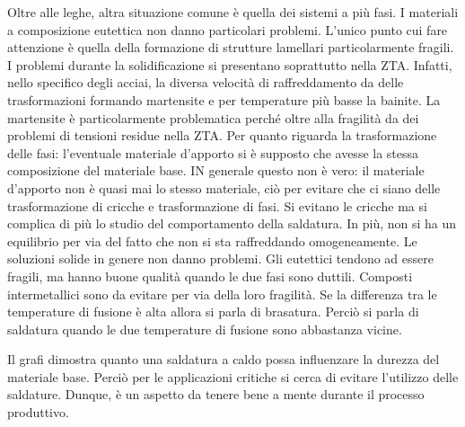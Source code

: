 Oltre alle leghe, altra situazione comune è quella dei sistemi a più fasi.
I materiali a composizione eutettica non danno particolari problemi. L'unico punto cui fare attenzione è quella della formazione di strutture lamellari particolarmente fragili.
I problemi durante la solidificazione si presentano soprattutto nella \ac{ZTA}.
Infatti, nello specifico degli acciai, la diversa velocità di raffreddamento da delle trasformazioni formando martensite e per temperature più basse la bainite.
La martensite è particolarmente problematica perché oltre alla fragilità da dei problemi di tensioni residue nella \ac{ZTA}.
Per quanto riguarda la trasformazione delle fasi: l'eventuale materiale d'apporto si è supposto che avesse la stessa composizione del materiale base. IN generale questo non è vero: il materiale d'apporto non è quasi mai lo stesso materiale, ciò per evitare che ci siano delle trasformazione di cricche e trasformazione di fasi.
Si evitano le cricche ma si complica di più lo studio del comportamento della saldatura. In più, non si ha un equilibrio per via del fatto che non si sta raffreddando omogeneamente.
Le soluzioni solide in genere non danno problemi.
Gli eutettici tendono ad essere fragili, ma hanno buone qualità quando le due fasi sono duttili.
Composti intermetallici sono da evitare per via della loro fragilità.
Se la differenza tra le temperature di fusione è alta allora si parla di brasatura.
Perciò si parla di saldatura quando le due temperature di fusione sono abbastanza vicine.

Il grafi dimostra quanto una saldatura a caldo possa influenzare la durezza del materiale base. Perciò per le applicazioni critiche si cerca di evitare l'utilizzo delle saldature. Dunque, è un aspetto da tenere bene a mente durante il processo produttivo.


